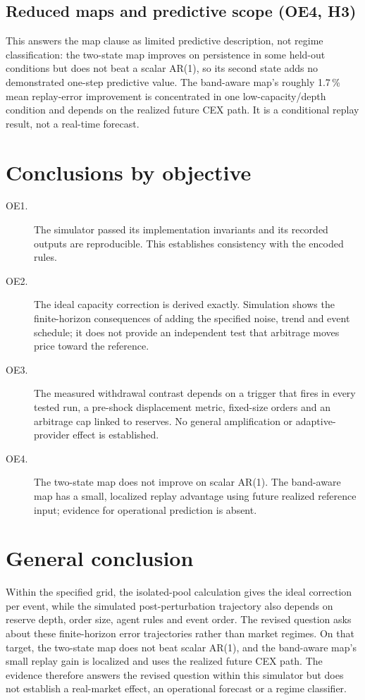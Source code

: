 \subsection{Reduced maps and predictive scope (OE4, H3)}

This answers the map clause as limited predictive description, not regime classification: the two-state map improves on persistence in some held-out conditions but does not beat a scalar AR(1), so its second state adds no demonstrated one-step predictive value. The band-aware map's roughly 1.7\,\% mean replay-error improvement is concentrated in one low-capacity/depth condition and depends on the realized future CEX path. It is a conditional replay result, not a real-time forecast.

\section{Conclusions by objective}

\begin{description}
  \item[OE1.] The simulator passed its implementation invariants and its recorded outputs are reproducible. This establishes consistency with the encoded rules.
  \item[OE2.] The ideal capacity correction is derived exactly. Simulation shows the finite-horizon consequences of adding the specified noise, trend and event schedule; it does not provide an independent test that arbitrage moves price toward the reference.
  \item[OE3.] The measured withdrawal contrast depends on a trigger that fires in every tested run, a pre-shock displacement metric, fixed-size orders and an arbitrage cap linked to reserves. No general amplification or adaptive-provider effect is established.
  \item[OE4.] The two-state map does not improve on scalar AR(1). The band-aware map has a small, localized replay advantage using future realized reference input; evidence for operational prediction is absent.
\end{description}

\section{General conclusion}

Within the specified grid, the isolated-pool calculation gives the ideal correction per event, while the simulated post-perturbation trajectory also depends on reserve depth, order size, agent rules and event order. The revised question asks about these finite-horizon error trajectories rather than market regimes. On that target, the two-state map does not beat scalar AR(1), and the band-aware map's small replay gain is localized and uses the realized future CEX path. The evidence therefore answers the revised question within this simulator but does not establish a real-market effect, an operational forecast or a regime classifier.

